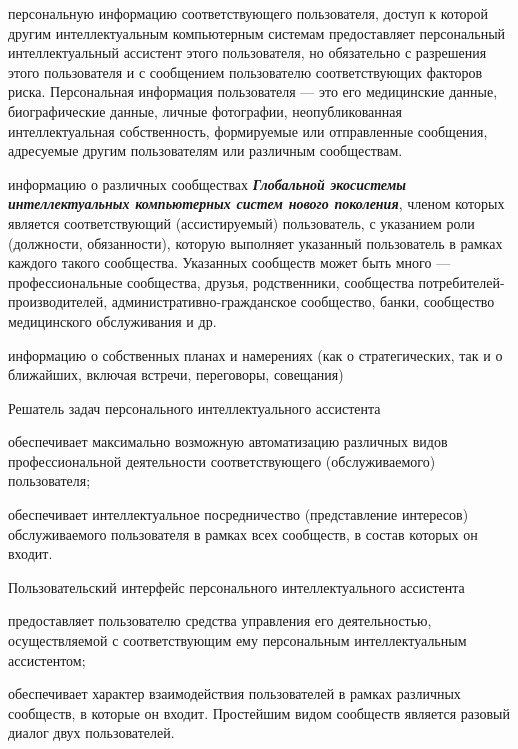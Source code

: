\begin{textitemize}
	\begin{textitemize}
		\item персональную информацию соответствующего пользователя, доступ к которой другим интеллектуальным компьютерным системам предоставляет персональный интеллектуальный ассистент этого пользователя, но обязательно с разрешения этого пользователя и с сообщением пользователю соответствующих факторов риска. Персональная информация пользователя --- это его медицинские данные, биографические данные, личные фотографии, неопубликованная интеллектуальная собственность, формируемые или отправленные сообщения, адресуемые другим пользователям или различным сообществам.
		\item информацию о различных сообществах \textbf{\textit{Глобальной экосистемы интеллектуальных компьютерных систем нового поколения}}, членом которых является соответствующий (ассистируемый) пользователь, с указанием роли (должности, обязанности), которую выполняет указанный пользователь в рамках каждого такого сообщества. Указанных сообществ может быть много --- профессиональные сообщества, друзья, родственники, сообщества потребителей-производителей, административно-гражданское сообщество, банки, сообщество медицинского обслуживания и др.
		\item информацию о собственных планах и намерениях (как о стратегических, так и о ближайших, включая встречи, переговоры, совещания)
	\end{textitemize}
	Решатель задач персонального интеллектуального ассистента
	\begin{textitemize}
		\item обеспечивает максимально возможную автоматизацию различных видов профессиональной   деятельности соответствующего (обслуживаемого) пользователя; 
		\item обеспечивает интеллектуальное посредничество (представление интересов) обслуживаемого пользователя в рамках всех сообществ, в состав которых он входит.
	\end{textitemize}
	Пользовательский интерфейс персонального интеллектуального ассистента
	\begin{textitemize}
		\item предоставляет пользователю средства управления его  деятельностью, осуществляемой  с соответствующим ему персональным интеллектуальным ассистентом;
		\item обеспечивает  характер взаимодействия пользователей в рамках различных сообществ, в которые он входит. Простейшим видом сообществ является разовый диалог двух пользователей.

\end{textitemize}
\end{textitemize}
